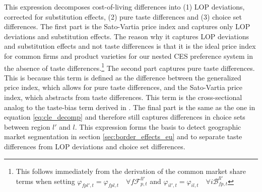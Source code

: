 This expression decomposes cost-of-living differences into (1) LOP deviations, corrected for substitution effects, (2) pure taste differences and (3) choice set differences. The first part is the Sato-Vartia price index and captures only LOP deviations and substitution effects. The reason why it captures LOP deviations and substitution effects and not taste differences is that it is the ideal price index for common firms and product varieties for our nested CES preference system in the absence of taste differences.\footnote{This follows immediately from the derivation of the common market share terms when setting $\varphi_{fpl',t} = \varphi_{fpl,t} \quad \forall f \mathcal{F}^{ll'}_{p,t}$ and $\varphi_{il',t} = \varphi_{il,t} \quad \forall i \mathcal{B}^{ll'}_{fp,t}$} The second part captures pure taste differences. This is because this term is defined as the difference between the generalized price index, which allows for pure taste differences, and the Sato-Vartia price index, which abstracts from taste differences. This term is the cross-sectional analog to the taste-bias term derived in \citet{Redding2020}. The final part is the same as the one in equation \ref{eq:cle_decomp} and therefore still captures differences in choice sets between region $l'$ and $l$. This expression forms the basis to detect geographic market segmentation in section \ref{sec:border_effects_eu} and to separate taste differences from LOP deviations and choice set differences.